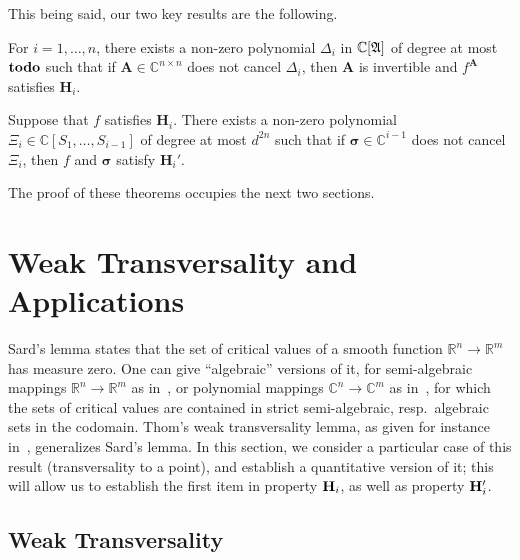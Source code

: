 \documentclass[sigconf]{acmart}
\def\td{{\bf todo}}
\def\mA{{\bm A}}
\def\C{\mathbb{C}}
\def\R{\mathbb{R}}
\def\D{\Delta}
\def\A{\frak{A}}
\begin{document}
\smallskip

This being said, our two key results are the following.
\begin{theorem}\label{theo:gen}
  For $i=1,\dots,n$, there exists a non-zero polynomial $\D_i$ in
  $\C[\A]$ of degree at most $\td$ such that if $\mA \in \C^{n\times
    n}$ does not cancel $\D_i$, then $\mA$ is invertible and $f^\mA$
  satisfies $\textbf{H}_i$.
\end{theorem}

\begin{theorem}
  Suppose that $f$ satisfies $\textbf{H}_i$. There exists a non-zero
  polynomial $\Xi_{i} \in \C[S_1,\dots,S_{i-1}]$ of degree at most
  $d^{2n}$ such that if $\bm \sigma \in \C^{i-1}$ does not
  cancel $\Xi_{i}$, then $f$ and $\bm \sigma$ satisfy $\textbf{H}_i'$.
\end{theorem}
\noindent 
The proof of these theorems occupies the next two sections.


\section{Weak Transversality and Applications}

Sard's lemma states that the set of critical values of a smooth
function $\R^n \to \R^m$ has measure zero. One can give ``algebraic''
versions of it, for semi-algebraic mappings $\R^n \to \R^m$ as
in~\cite[Chapter~9]{bochnak1998real}, or polynomial mappings $\C^n \to
\C^m$ as in~\cite[Chapter~3]{Mumford76}, for which the sets of
critical values are contained in strict semi-algebraic,
resp.\ algebraic sets in the codomain. Thom's weak transversality
lemma, as given for instance in~\cite{demazure2000bifurcations},
generalizes Sard's lemma. In this section, we consider a particular
case of this result (transversality to a point), and establish a
quantitative version of it; this will allow us to establish the first
item in property ${\bf H}_i$, as well as property ${\bf H}'_i$. 


\subsection{Weak Transversality}
\end{document}
